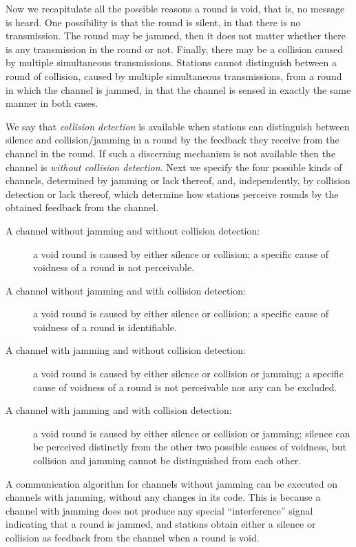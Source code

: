 \documentclass[11pt]{article}
\begin{document}
Now we recapitulate all the possible reasons a round is void, that is, no message is heard.
One possibility is that the round is silent, in that there is no transmission.
The round may be jammed, then it does not matter whether there is any transmission in the round or not.
Finally, there may be a collision caused by multiple simultaneous transmissions.
Stations cannot distinguish between a round of collision, caused by multiple simultaneous transmissions, from a round in which the channel is jammed, in that the channel is sensed in exactly the same manner in both cases.

We say that \emph{collision detection} is available when stations can distinguish between silence and collision/jamming in a round by the feedback they receive from the channel in the round. 
If such a discerning mechanism is not available then the channel is \emph{without collision detection}.
Next we specify the four possible kinds of channels, determined by jamming or lack thereof, and, independently, by collision detection or lack thereof, which determine how stations perceive rounds by the obtained feedback from the channel.
\begin{description}
\item[\rm A channel without jamming and without collision detection:] 
a void round is caused by either silence or collision; a specific cause of voidness of a round is not perceivable.
\item[\rm A channel without jamming and with collision detection:] 
a void round is caused by either silence or collision; a specific cause of voidness of a round is identifiable.
\item[\rm A channel with jamming and without collision detection:] 
a void round is caused by either silence or collision or jamming; a specific cause of voidness of a round is not perceivable nor any can be excluded.
\item[\rm A channel with jamming and with collision detection:] 
a void round is caused by either silence or collision or jamming; silence can be perceived distinctly from the other two possible causes of voidness, but collision and jamming cannot be distinguished from each other.
\end{description}


A communication algorithm for channels without jamming can be executed on channels with jamming, without any changes in its code.
This is because a channel with jamming does not produce any special ``interference'' signal indicating that a round is jammed, and stations obtain either a silence or collision as  feedback from the channel when a round is void.
\end{document}
